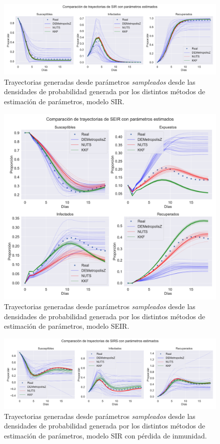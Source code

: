 \begin{figure}[h]
    \centering
    \includegraphics[width=\linewidth]{img/content/chapter4/SIR_traj_params.pdf}
    \caption{Trayectorias generadas desde parámetros \textit{sampleados} desde las densidades de probabilidad generada por los distintos métodos de estimación de parámetros, modelo SIR.}
    \label{fig:SIR_traj_params}
\end{figure}

\begin{figure}[h]
    \centering
    \includegraphics[width=\linewidth]{img/content/chapter4/SEIR_traj_params.pdf}
    \caption{Trayectorias generadas desde parámetros \textit{sampleados} desde las densidades de probabilidad generada por los distintos métodos de estimación de parámetros, modelo SEIR.}
    \label{fig:SEIR_traj_params}
\end{figure}

\begin{figure}[h]
    \centering
    \includegraphics[width=\linewidth]{img/content/chapter4/SIRS_traj_params.pdf}
    \caption{Trayectorias generadas desde parámetros \textit{sampleados} desde las densidades de probabilidad generada por los distintos métodos de estimación de parámetros, modelo SIR con pérdida de inmunidad.}
    \label{fig:SIRS_traj_params}
\end{figure}